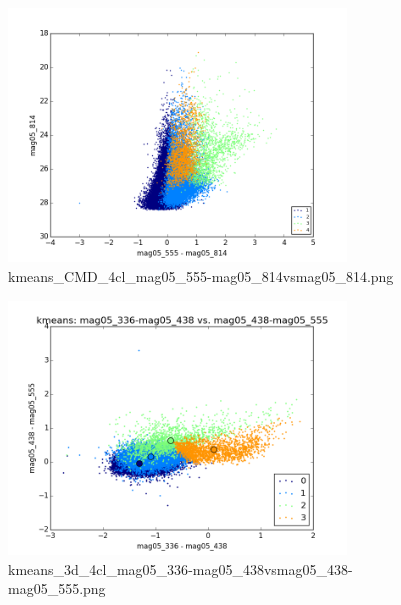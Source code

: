 \documentclass{article}%
\begin{document}
\begin{figure}%
\centering%
\includegraphics[width=0.8\textwidth]{kmeans_CMD_4cl_mag05_555-mag05_814vsmag05_814.png}%
\caption{kmeans\_CMD\_4cl\_mag05\_555{-}mag05\_814vsmag05\_814.png}%
\end{figure}

%


\begin{figure}%
\centering%
\includegraphics[width=0.8\textwidth]{kmeans_3d_4cl_mag05_336-mag05_438vsmag05_438-mag05_555.png}%
\caption{kmeans\_3d\_4cl\_mag05\_336{-}mag05\_438vsmag05\_438{-}mag05\_555.png}%
\end{figure}

%
\end{document}
